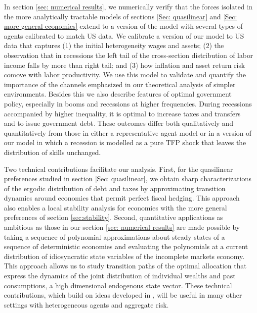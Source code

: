 \documentclass[thmsb,11pt]{article}
\begin{document}


In section \ref{sec: numerical results},
we numerically verify that the forces isolated in the more analytically tractable  models of sections \ref{Sec: quasilinear}
  and \ref{Sec: more general economies} extend to a version of the model with several types of agents  calibrated to match US data.
We calibrate a version of our model to US data that captures (1) the initial heterogeneity wages and assets;
(2) the observation  that  in recessions the left tail of the cross-section distribution of labor income falls by more than right tail; and (3) how inflation and asset return risk comove with labor productivity. 
We use this model to validate and quantify the importance of the channels  emphasized in our theoretical analysis of simpler environments. Besides this we also describe features of optimal government policy, especially in booms and recessions at higher frequencies.
During recessions accompanied by higher inequality, it is  optimal to increase taxes and transfers and to issue
government debt. %
These outcomes differ both qualitatively and quantitatively from those in either a representative agent model or in a version
of our model in which a  recession is modelled as a pure TFP shock that leaves the distribution of skills unchanged.


Two technical contributions facilitate our analysis. First, for the quasilinear preferences studied in section \ref{Sec: quasilinear}, 
we obtain sharp characterizations of the ergodic distribution of debt and taxes by approximating transition dynamics around economies that
permit perfect fiscal hedging. This approach also enables a local stability analysis for economies with the more general
preferences of section \ref{sec:stability}. Second, quantitative applications as ambitious as those in our section \ref{sec: numerical results}
are made possible by taking a sequence of polynomial approximations about steady states of a sequence of deterministic economies and evaluating the
polynomials at a current distribution of idiosyncratic state variables of the incomplete markets economy. This approach allows us to study transition paths of the optimal allocation
that express the dynamics of the joint distribution of individual wealths and past consumptions, a high dimensional
endogenous state vector. These technical contributions, which build on ideas developed in \cite{Evans2014}, will be useful in many other settings 
with heterogeneous agents and aggregate risk. 
\end{document}
